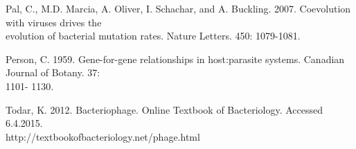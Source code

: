 \documentclass[11pt, oneside]{article}
\begin{document}
Pal, C., M.D. Marcia, A. Oliver, I. Schachar, and A. Buckling. 2007. Coevolution with viruses drives the \\\-\hspace{0.75cm} evolution of bacterial mutation rates. Nature Letters. 450: 1079-1081.

Person, C. 1959. Gene-for-gene relationships in host:parasite systems. Canadian Journal of Botany. 37: \\\-\hspace{0.75cm} 1101- 1130.

Todar, K. 2012. Bacteriophage. Online Textbook of Bacteriology. Accessed 6.4.2015.\\\-\hspace{0.75cm} http://textbookofbacteriology.net/phage.html
\end{document}
